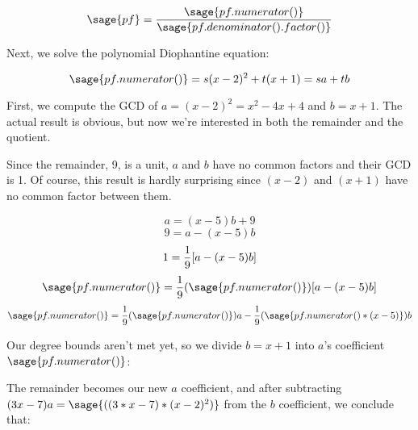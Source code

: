 \begin{comment}
Differentiating to obtain $3x^2-6x$.
Computing the GCD of $x^3-3x^2+4$ and $3x^2-6x$:

\sympyc{long_division(x**3-3*x**2+4, 3*x**2-6*x, x)}
\bigskip
\sympyc{long-division(3*x**2-6*x, -2*x+4)}


Thus, $-2x+4$ is a GCD, which we normalize by dividing through by -2
to obtain $x-2$.  We could now proceed by dividing $x^3-3x^2+4$ by
$x-2$ to obtain $x^2-x-2$ (all factors at unit power), compute the GCD
of $x-2$ and $x^2-x-2$ to obtain $x-2$ (all higher factors at unit
power), divide $x^2-x-2$ by $x-2$ to obtain $x+1$ (the unit
square-free factor), and repeat the process (trivially) with $x-2$ to
decide that $x-2$ is the second square-free factor.  Or, we could
shortcut the entire process by noting that since $x-2$ is linear,
it can only be the second square-free factor.  In any event, we conclude that:

\end{comment}

$$ \sage{pf} = \frac{\sage{pf.numerator()}}{\sage{pf.denominator().factor()}} $$

Next, we solve the polynomial Diophantine equation:

$$ \sage{pf.numerator()} = s(x-2)^2 + t(x+1) = sa+tb $$

First, we compute the GCD of $a=(x-2)^2=x^2-4x+4$ and $b=x+1$.
The actual result is obvious, but now we're interested
in both the remainder and the quotient.


Since the remainder, 9, is a unit, $a$ and $b$ have no common
factors and their GCD is 1.  Of course, this result is hardly
surprising since $(x-2)$ and $(x+1)$
have no common factor between them.

$$a=(x-5)b+9$$
$$9=a-(x-5)b$$
$$1={1\over9}[a-(x-5)b]$$
$$ \sage{pf.numerator()} = {1\over9}(\sage{pf.numerator()})[a-(x-5)b]$$
$$ \sage{pf.numerator()} = {1\over9}(\sage{pf.numerator()})a-{1\over9}(\sage{pf.numerator()*(x-5)})b$$

Our degree bounds aren't met yet, so we divide $b=x+1$ into $a$'s coefficient $\sage{pf.numerator()}$:


The remainder becomes our new $a$ coefficient,
and after subtracting $(3x-7)a=\sage{((3*x-7)*(x-2)^2)}$ from the $b$ coefficient,
we conclude that:

